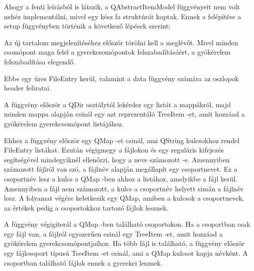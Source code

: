 Ahogy a fenti leírásból is látszik, 
a {\ttfamily QAbstractItemModel} függvényeit nem volt nehéz implementálni, 
mivel egy kész fa struktúrát kaptak. 
Ennek a felépítése a {\ttfamily setup} függvényben történik 
a következő lépések szerint:
\begin{description}[font=\normalfont
\stepcounter{descriptcount}\arabic{descriptcount}.~]
\item [\textit{A meglévő gyökérelem törlése:}]
Az új tartalom megjelenítéséhez először törölni kell a meglévőt.
Mivel minden csomópont maga felel 
a gyerekcsomópontok felszabadításáért, 
a gyökérelem felszabadítása elegendő.
\item [\textit{Az új gyökérelem elkészítése:}]
Ebbe egy üres {\ttfamily FileEntry} kerül, 
valamint a {\ttfamily data} függvény számára 
az oszlopok header feliratai.
\item [{\itshape A mappákhoz tartozó csomópontok hozzáadása:}]
A függvény először a {\ttfamily QDir} osztálytól lekérdez 
egy listát a mappákról, 
majd minden mappa alapján csinál 
egy azt reprezentáló {\ttfamily TreeItem} -et, 
amit hozzáad a gyökérelem gyerekcsomópont listájához.
\item [\textit{Fájlcsoportok keresése:}]
Ehhez a függvény először egy {\ttfamily QMap} -et csinál, 
ami {\ttfamily QString} kulcsokhoz rendel {\ttfamily FileEntry} listákat. 
Ezután végigmegy a fájlokon és 
egy reguláris kifejezés segítségével mindegyiknél ellenőrzi, 
hogy a neve számozott -e. 
Amennyiben számozott fájlról van szó, 
a fájlnév alapján megállapít egy csoportnevet. 
Ez a csoportnév lesz a kulcs a {\ttfamily QMap} -ben ahhoz a listához, 
amelyikbe a fájl kerül. 
Amennyiben a fájl nem számozott, 
a kulcs a csoportnév helyett simán a fájlnév lesz. 
A folyamat végére keletkezik egy {\ttfamily QMap}, 
amiben a kulcsok a csoportnevek, 
az értékek pedig a csoportokhoz tartozó fájlok lesznek. 
\item [\textit{A fájlok és fájlcsoportok hozzáadása:}]
A függvény végigiterál a {\ttfamily QMap} -ben található csoportokon. 
Ha a csoportban csak egy fájl van, 
a fájlról egyszerűen csinál egy {\ttfamily TreeItem} -et, 
amit hozzáad a gyökérelem gyerekcsomópontjaihoz. 
Ha több fájl is található, 
a függvény először egy fájlcsoport típusú {\ttfamily TreeItem} -et csinál, 
ami a {\ttfamily QMap} kulcsot kapja névként. 
A csoportban található fájlok ennek a gyerekei lesznek. 
\end{description}

\vspace{2mm}


